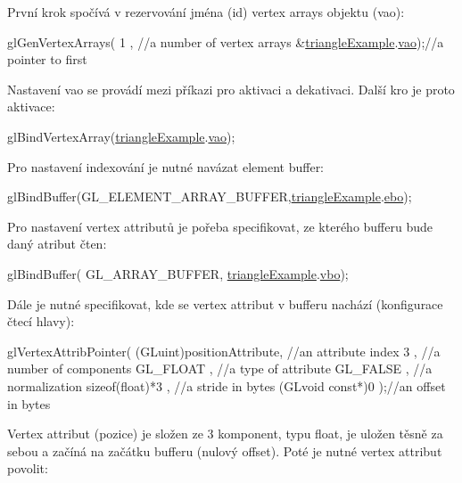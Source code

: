 První krok spočívá v rezervování jména (id) vertex arrays objektu (vao)\-: 
\begin{DoxyCodeInclude}
  glGenVertexArrays(
      1                   , \textcolor{comment}{//a number of vertex arrays}
      &\hyperlink{triangleExample_8c_af82b723635ac0c90962571915a1b1163}{triangleExample}.\hyperlink{structTriangleExampleVariables_a4230de13079947c4093b8d75ad1d5035}{vao});\textcolor{comment}{//a pointer to first }
\end{DoxyCodeInclude}
Nastavení vao se provádí mezi příkazi pro aktivaci a dekativaci. Další kro je proto aktivace\-: 
\begin{DoxyCodeInclude}
  glBindVertexArray(\hyperlink{triangleExample_8c_af82b723635ac0c90962571915a1b1163}{triangleExample}.\hyperlink{structTriangleExampleVariables_a4230de13079947c4093b8d75ad1d5035}{vao});
\end{DoxyCodeInclude}
Pro nastavení indexování je nutné navázat element buffer\-: 
\begin{DoxyCodeInclude}
  glBindBuffer(GL\_ELEMENT\_ARRAY\_BUFFER,\hyperlink{triangleExample_8c_af82b723635ac0c90962571915a1b1163}{triangleExample}.\hyperlink{structTriangleExampleVariables_a9e7c6acc784faacf21bca7c46f9f4244}{ebo});
\end{DoxyCodeInclude}
Pro nastavení vertex attributů je pořeba specifikovat, ze kterého bufferu bude daný atribut čten\-: 
\begin{DoxyCodeInclude}
  glBindBuffer(
      GL\_ARRAY\_BUFFER,
      \hyperlink{triangleExample_8c_af82b723635ac0c90962571915a1b1163}{triangleExample}.\hyperlink{structTriangleExampleVariables_af3b747228ed4a26fffca56a69838ecae}{vbo});
\end{DoxyCodeInclude}
Dále je nutné specifikovat, kde se vertex attribut v bufferu nachází (konfigurace čtecí hlavy)\-: 
\begin{DoxyCodeInclude}
  glVertexAttribPointer(
      (GLuint)positionAttribute, \textcolor{comment}{//an attribute index}
      3                        , \textcolor{comment}{//a number of components}
      GL\_FLOAT                 , \textcolor{comment}{//a type of attribute}
      GL\_FALSE                 , \textcolor{comment}{//a normalization}
      \textcolor{keyword}{sizeof}(\textcolor{keywordtype}{float})*3          , \textcolor{comment}{//a stride in bytes}
      (GLvoid \textcolor{keyword}{const}*)0         );\textcolor{comment}{//an offset in bytes}
\end{DoxyCodeInclude}
Vertex attribut (pozice) je složen ze 3 komponent, typu float, je uložen těsně za sebou a začíná na začátku bufferu (nulový offset). Poté je nutné vertex attribut povolit\-: 

